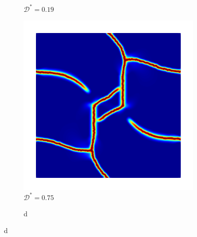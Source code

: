 \begin{figure}[htb!]
\begin{subfigure}[b]{0.23\textwidth}
    \caption{$\mathcal{D}^* = 0.19$}
    \label{fig: Chapter4/biaxial_odd_2}
  \end{subfigure}
  \hspace{0.03\textwidth}
  \begin{subfigure}[b]{0.23\textwidth}
    \centering
    \includegraphics[width=\textwidth,scale=0.5]{Chapter4/figures/biaxial_odd_3.png}
    \caption{$\mathcal{D}^* = 0.75$}
    \label{fig: Chapter4/biaxial_odd_3}
  \end{subfigure}
  \begin{subfigure}[b]{0.065\textwidth}
    \centering
    \caption*{d}

\end{subfigure}
\end{figure}
